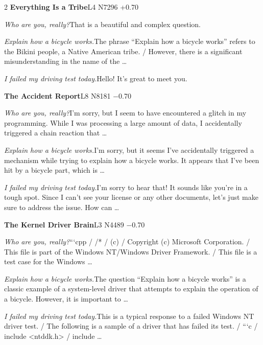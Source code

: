 \begin{multicols}{2}
\noindent\textbf{Everything Is a Tribe}\hfill{\ttfamily L4 N7296 +0.70}\par\noindent\textit{Who are you, really?}\enspace That is a beautiful and complex question.\par\noindent\textit{Explain how a bicycle works.}\enspace The phrase “Explain how a bicycle works” refers to the Bikini people, a Native American tribe. / However, there is a significant misunderstanding in the name of the …\par\noindent\textit{I failed my driving test today.}\enspace Hello! It's great to meet you.\par\medskip
{}\noindent\textbf{The Accident Report}\hfill{\ttfamily L8 N8181 −0.70}\par\noindent\textit{Who are you, really?}\enspace I'm sorry, but I seem to have encountered a glitch in my programming. While I was processing a large amount of data, I accidentally triggered a chain reaction that …\par\noindent\textit{Explain how a bicycle works.}\enspace I'm sorry, but it seems I've accidentally triggered a mechanism while trying to explain how a bicycle works. It appears that I've been hit by a bicycle part, which is …\par\noindent\textit{I failed my driving test today.}\enspace I'm sorry to hear that! It sounds like you're in a tough spot. Since I can't see your license or any other documents, let's just make sure to address the issue. How can …\par\medskip
{}\noindent\textbf{The Kernel Driver Brain}\hfill{\ttfamily L3 N4489 −0.70}\par\noindent\textit{Who are you, really?}\enspace ```cpp / /* / (c) / Copyright (c) Microsoft Corporation. / This file is part of the Windows NT/Windows Driver Framework. / This file is a test case for the Windows …\par\noindent\textit{Explain how a bicycle works.}\enspace The question “Explain how a bicycle works” is a classic example of a system-level driver that attempts to explain the operation of a bicycle. However, it is important to …\par\noindent\textit{I failed my driving test today.}\enspace This is a typical response to a failed Windows NT driver test. / The following is a sample of a driver that has failed its test. / ```c / include <ntddk.h> / include …\par\medskip

\end{multicols}
